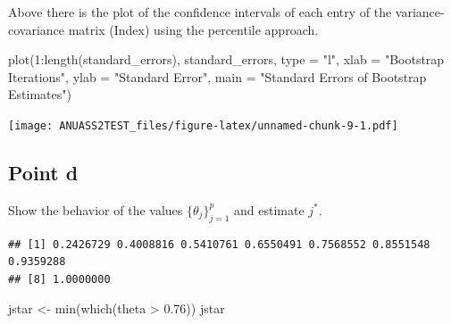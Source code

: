 \documentclass[
]{article}
\newenvironment{Shaded}{\begin{snugshade}}{\end{snugshade}}
\newcommand{\AttributeTok}[1]{\textcolor[rgb]{0.77,0.63,0.00}{#1}}
\newcommand{\DecValTok}[1]{\textcolor[rgb]{0.00,0.00,0.81}{#1}}
\newcommand{\FloatTok}[1]{\textcolor[rgb]{0.00,0.00,0.81}{#1}}
\newcommand{\FunctionTok}[1]{\textcolor[rgb]{0.00,0.00,0.00}{#1}}
\newcommand{\NormalTok}[1]{#1}
\newcommand{\OtherTok}[1]{\textcolor[rgb]{0.56,0.35,0.01}{#1}}
\newcommand{\SpecialCharTok}[1]{\textcolor[rgb]{0.00,0.00,0.00}{#1}}
\newcommand{\StringTok}[1]{\textcolor[rgb]{0.31,0.60,0.02}{#1}}
\begin{document}
Above there is the plot of the confidence intervals of each entry of the
variance-covariance matrix (Index) using the percentile approach.

\begin{Shaded}
\begin{Highlighting}[]
\FunctionTok{plot}\NormalTok{(}\DecValTok{1}\SpecialCharTok{:}\FunctionTok{length}\NormalTok{(standard\_errors), standard\_errors, }\AttributeTok{type =} \StringTok{"l"}\NormalTok{, }
     \AttributeTok{xlab =} \StringTok{"Bootstrap Iterations"}\NormalTok{, }\AttributeTok{ylab =} \StringTok{"Standard Error"}\NormalTok{, }
     \AttributeTok{main =} \StringTok{"Standard Errors of Bootstrap Estimates"}\NormalTok{)}
\end{Highlighting}
\end{Shaded}

\texttt{[image: ANUASS2TEST\_files/figure-latex/unnamed-chunk-9-1.pdf]}

\hypertarget{point-d}{%
\subsection{Point d}\label{point-d}}

Show the behavior of the values \(\{\theta_j\}_{j=1}^p\) and estimate
\(j^*\).

\begin{Shaded}
\end{Shaded}

\begin{verbatim}
## [1] 0.2426729 0.4008816 0.5410761 0.6550491 0.7568552 0.8551548 0.9359288
## [8] 1.0000000
\end{verbatim}

\begin{Shaded}
\begin{Highlighting}[]
\NormalTok{jstar }\OtherTok{\textless{}{-}} \FunctionTok{min}\NormalTok{(}\FunctionTok{which}\NormalTok{(theta }\SpecialCharTok{\textgreater{}} \FloatTok{0.76}\NormalTok{))}
\NormalTok{jstar}
\end{Highlighting}
\end{Shaded}
\end{document}
